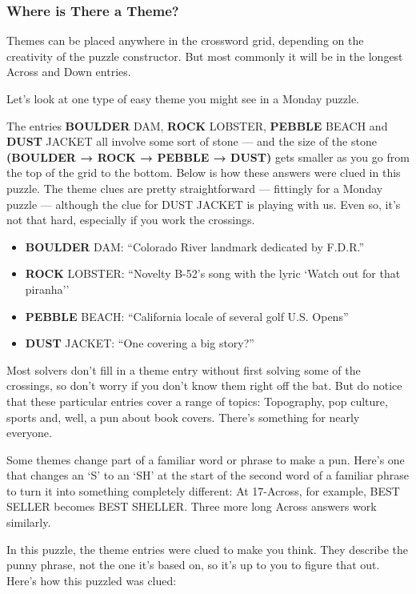 \hypertarget{where-is-there-a-theme}{%
\subsubsection{Where is There a Theme?}\label{where-is-there-a-theme}}

Themes can be placed anywhere in the crossword grid, depending on the
creativity of the puzzle constructor. But most commonly it will be in
the longest Across and Down entries.

Let's look at one type of easy theme you might see in a Monday puzzle.

The entries \textbf{BOULDER} DAM, \textbf{ROCK} LOBSTER, \textbf{PEBBLE}
BEACH and \textbf{DUST} JACKET all involve some sort of stone --- and
the size of the stone \textbf{(BOULDER → ROCK → PEBBLE → DUST)} gets
smaller as you go from the top of the grid to the bottom. Below is how
these answers were clued in this puzzle. The theme clues are pretty
straightforward --- fittingly for a Monday puzzle --- although the clue
for DUST JACKET is playing with us. Even so, it's not that hard,
especially if you work the crossings.~

\begin{itemize}
\tightlist
\item
  \textbf{BOULDER} DAM: ``Colorado River landmark dedicated by F.D.R.''
\item
  \textbf{ROCK} LOBSTER: ``Novelty B-52's song with the lyric `Watch out
  for that piranha''
\item
  \textbf{PEBBLE} BEACH: ``California locale of several golf U.S.
  Opens''
\item
  \textbf{DUST} JACKET: ``One covering a big story?''
\end{itemize}

Most solvers don't fill in a theme entry without first solving some of
the crossings, so don't worry if you don't know them right off the bat.
But do notice that these particular entries cover a range of topics:
Topography, pop culture, sports and, well, a pun about book covers.
There's something for nearly everyone.~

Some themes change part of a familiar word or phrase to make a pun.
Here's one that changes an `S' to an `SH' at the start of the second
word of a familiar phrase to turn it into something completely
different: At 17-Across, for example, BEST SELLER becomes BEST SHELLER.
Three more long Across answers work similarly.

In this puzzle, the theme entries were clued to make you think. They
describe the punny phrase, not the one it's based on, so it's up to you
to figure that out. Here's how this puzzled was clued:

